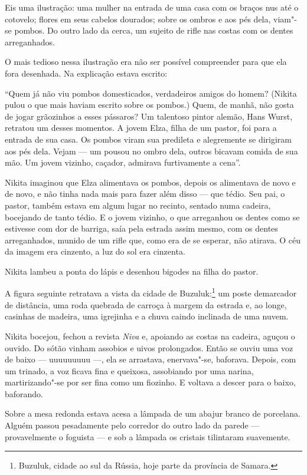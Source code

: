 Eis uma ilustração: uma mulher na entrada de uma casa com os braços nus
até o cotovelo; flores em seus cabelos dourados; sobre os ombros e aos
pés dela, viam"-se pombos. Do outro lado da cerca, um sujeito de rifle
nas costas com os dentes arreganhados.

O mais tedioso nessa ilustração era não ser possível compreender para
que ela fora desenhada. Na explicação estava escrito:

``Quem já não viu pombos domesticados, verdadeiros amigos do homem?
(Nikita pulou o que mais haviam escrito sobre os pombos.) Quem, de manhã, não
gosta de jogar grãozinhos a esses pássaros? Um talentoso pintor alemão,
Hans Wurst, retratou um desses momentos. A jovem Elza, filha de um
pastor, foi para a entrada de sua casa. Os pombos viram sua predileta e
alegremente se dirigiram aos pés dela. Vejam --- um pousou no ombro
dela, outros bicavam comida de sua mão. Um jovem vizinho, caçador,
admirava furtivamente a cena''.

Nikita imaginou que Elza alimentava os pombos, depois os alimentava de
novo e de novo, e não tinha nada mais para fazer além disso --- que
tédio. Seu pai, o pastor, também estava em algum lugar no recinto,
sentado numa cadeira, bocejando de tanto tédio. E o jovem vizinho, o que
arreganhou os dentes como se estivesse com dor de barriga, saía pela
estrada assim mesmo, com os dentes arreganhados, munido de um rifle que,
como era de se esperar, não atirava. O céu da imagem era cinzento, a luz
do sol era cinzenta.

Nikita lambeu a ponta do lápis e desenhou bigodes na filha do pastor.

A figura seguinte retratava a vista da cidade de Buzuluk:\footnote{Buzuluk,
  cidade ao sul da Rússia, hoje parte da província de Samara.} um poste
demarcador de distância, uma roda quebrada de carroça à margem da
estrada e, ao longe, casinhas de madeira, uma igrejinha e a chuva caindo
inclinada de uma nuvem.

Nikita bocejou, fechou a revista \emph{Niva} e, apoiando as costas na
cadeira, aguçou o ouvido. Do sótão vinham assobios e uivos prolongados.
Então se ouviu uma voz de baixo --- uuuuuuuuu ---, ela se arrastava,
enervava"-se, baforava. Depois, com um trinado, a voz ficava fina e
queixosa, assobiando por uma narina, martirizando"-se por ser fina como
um fiozinho. E voltava a descer para o baixo, baforando.

Sobre a mesa redonda estava acesa a lâmpada de um abajur branco de
porcelana. Alguém passou pesadamente pelo corredor do outro lado da
parede --- provavelmente o foguista --- e sob a lâmpada os cristais
tilintaram suavemente.

